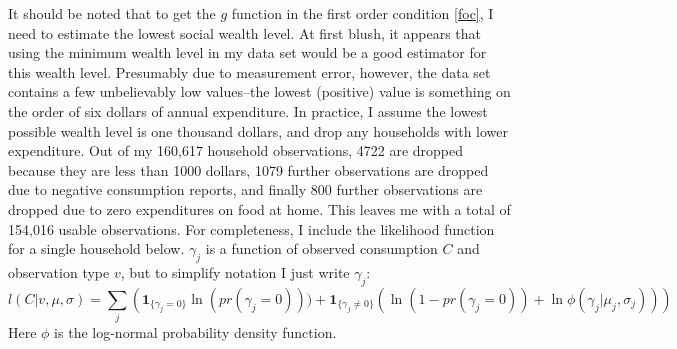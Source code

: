 \documentclass{article}
\begin{document}
%
%
It should be noted that to get the $g$ function in the first order condition \eqref{foc}, I need to estimate the lowest social wealth level. 
At first blush, it appears that using the minimum wealth level in my data set would be a good estimator for this wealth level.
Presumably due to measurement error, however, the data set contains a few unbelievably low values--the lowest (positive) value is something on the order of six dollars of annual expenditure.
In practice, I assume the lowest possible wealth level is one thousand dollars, and drop any households with lower expenditure.
Out of my 160,617 household observations, 4722 are dropped because they are less than 1000 dollars, 1079 further observations are dropped due to negative consumption reports, and finally 800 further observations are dropped due to zero expenditures on food at home.
This leaves me with a total of 154,016 usable observations.
For completeness, I include the likelihood function for a single household below.  $\gamma_j$ is a function of observed consumption $C$ and observation type $v$, but to simplify notation I just write $\gamma_j$:
\begin{equation}
	\label{lik1}
	l(C|v,\mu,\sigma) = \sum_{j} \left(\mathbf{1}_{\{\gamma_j = 0\}}\ln\left(pr(\gamma_j=0)\right)) + \mathbf{1}_{\{\gamma_j \neq 0\}} \left(\ln\left(1-pr(\gamma_j = 0)\right)+\ln \phi(\gamma_j|\mu_j,\sigma_j)\right)\right)
\end{equation}
Here $\phi$ is the log-normal probability density function.
\end{document}

